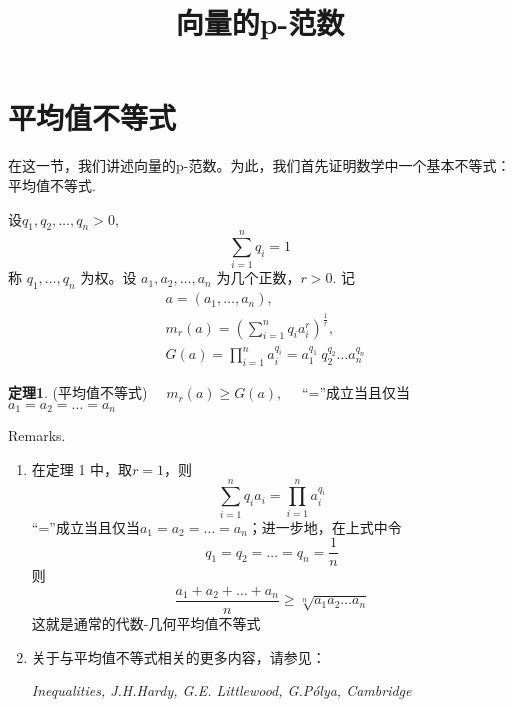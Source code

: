 \documentclass{article}
\title{向量的p-范数}
\author{}
\date{}
\begin{document}
\maketitle

\section{平均值不等式}
在这一节，我们讲述向量的p-范数。为此，我们首先证明数学中一个基本不等式：平均值不等式.

\vspace{20pt}
\noindent 设\(q_1,q_2,\dots ,q_n > 0\),
\begin{equation*}
    \sum_{i=1}^n q_i = 1
\end{equation*}
称 \(q_1,\dots ,q_n\) 为权。设 \(a_1,a_2,\dots ,a_n\) 为几个正数，\(r > 0\). 记
\begin{align*}
    & a =(a_1,\dots ,a_n), \\
    & m_r(a) =(\sum_{i=1}^n q_i a_i^r)^{\frac{1}{r}}, \\
    & G(a) = \prod_{i=1}^n a_i^{q_i} = a_1^{q_1} \ q_2^{q_2} \dots a_n^{q_n}
\end{align*}

\textbf{定理1}. (平均值不等式) \(\quad m_r(a) \ge G(a),\quad \) “=”成立当且仅当 \(a_1 = a_2 = \dots = a_n\)


\vspace{20pt}

\noindent Remarks.
\begin{enumerate}
    \item 在定理 1 中，取\(r = 1\)，则
        \begin{equation*}
            \sum_{i=1}^n q_i a_i = \prod_{i=1}^n a_i^{q_i}
        \end{equation*}
        “=”成立当且仅当\(a_1 = a_2 = \dots = a_n\)；进一步地，在上式中令
        \begin{equation*}
            q_1 = q_2 = \dots = q_n = \frac{1}{n}
        \end{equation*}
        则
        \begin{equation*}
            \frac{a_1 + a_2 + \dots + a_n}{n} \ge \sqrt[n]{a_1 a_2 \dots a_n}
        \end{equation*}
        这就是通常的代数-几何平均值不等式

    \item 关于与平均值不等式相关的更多内容，请参见：

    \textit{Inequalities, J.H.Hardy, G.E. Littlewood, G.Pólya, Cambridge}
\end{enumerate}
\end{document}
